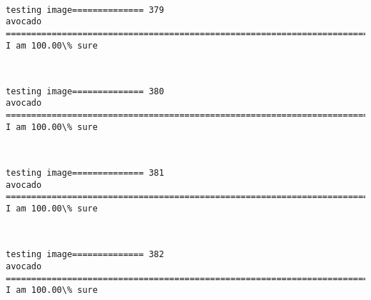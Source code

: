 \documentclass[11pt]{article}
\begin{document}
    \begin{center}
    \end{center}
    { \hspace*{\fill} \\}
    
    \begin{Verbatim}[commandchars=\\\{\}]
testing image============== 379
avocado
============================================================================
I am 100.00\% sure

    \end{Verbatim}

    \begin{center}
    \end{center}
    { \hspace*{\fill} \\}
    
    \begin{Verbatim}[commandchars=\\\{\}]
testing image============== 380
avocado
============================================================================
I am 100.00\% sure

    \end{Verbatim}

    \begin{center}
    \end{center}
    { \hspace*{\fill} \\}
    
    \begin{Verbatim}[commandchars=\\\{\}]
testing image============== 381
avocado
============================================================================
I am 100.00\% sure

    \end{Verbatim}

    \begin{center}
    \end{center}
    { \hspace*{\fill} \\}
    
    \begin{Verbatim}[commandchars=\\\{\}]
testing image============== 382
avocado
============================================================================
I am 100.00\% sure

    \end{Verbatim}
\end{document}
